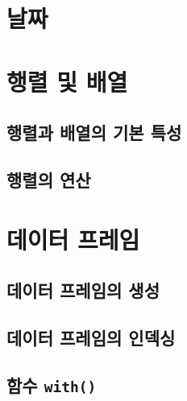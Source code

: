 \documentclass[
]{book}
\begin{document}
\hypertarget{uxb0a0uxc9dc}{%
\section{날짜}\label{uxb0a0uxc9dc}}

\hypertarget{uxd589uxb82c-uxbc0f-uxbc30uxc5f4}{%
\section{행렬 및 배열}\label{uxd589uxb82c-uxbc0f-uxbc30uxc5f4}}

\hypertarget{uxd589uxb82cuxacfc-uxbc30uxc5f4uxc758-uxae30uxbcf8-uxd2b9uxc131}{%
\subsection{행렬과 배열의 기본 특성}\label{uxd589uxb82cuxacfc-uxbc30uxc5f4uxc758-uxae30uxbcf8-uxd2b9uxc131}}

\hypertarget{uxd589uxb82cuxc758-uxc5f0uxc0b0}{%
\subsection{행렬의 연산}\label{uxd589uxb82cuxc758-uxc5f0uxc0b0}}

\hypertarget{section-dataframe}{%
\section{데이터 프레임}\label{section-dataframe}}

\hypertarget{uxb370uxc774uxd130-uxd504uxb808uxc784uxc758-uxc0dduxc131}{%
\subsection{데이터 프레임의 생성}\label{uxb370uxc774uxd130-uxd504uxb808uxc784uxc758-uxc0dduxc131}}

\hypertarget{uxb370uxc774uxd130-uxd504uxb808uxc784uxc758-uxc778uxb371uxc2f1}{%
\subsection{데이터 프레임의 인덱싱}\label{uxb370uxc774uxd130-uxd504uxb808uxc784uxc758-uxc778uxb371uxc2f1}}

\hypertarget{uxd568uxc218-with}{%
\subsection{\texorpdfstring{함수 \texttt{with()}}{함수 with()}}\label{uxd568uxc218-with}}
\end{document}
